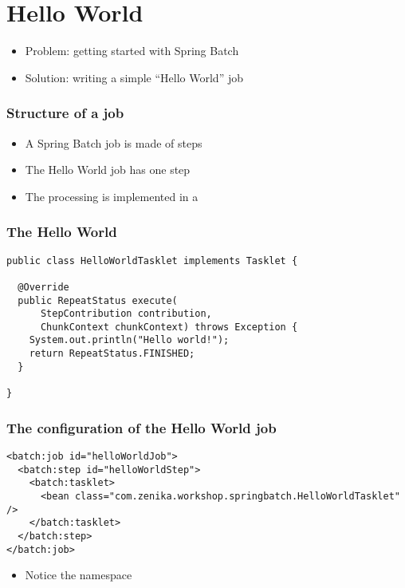 \section{Hello World}

\begin{frame}
 \begin{itemize}
  \item Problem: getting started with Spring Batch
  \item Solution: writing a simple ``Hello World'' job
 \end{itemize}
\end{frame}

\begin{frame}
 \frametitle{Structure of a job}
 \begin{itemize}
  \item A Spring Batch job is made of steps
  \item The Hello World job has one step
  \item The processing is implemented in a 
 \end{itemize}
\end{frame}

\begin{frame}[fragile]
\frametitle{The Hello World }
\lstset{language=Java}
\begin{lstlisting}
public class HelloWorldTasklet implements Tasklet {

  @Override
  public RepeatStatus execute(
      StepContribution contribution,
      ChunkContext chunkContext) throws Exception {
    System.out.println("Hello world!");
    return RepeatStatus.FINISHED;
  }

}
\end{lstlisting}
\end{frame}

\begin{frame}[fragile]
\frametitle{The configuration of the Hello World job}
\lstset{language=XML}
\begin{lstlisting}
<batch:job id="helloWorldJob">
  <batch:step id="helloWorldStep">
    <batch:tasklet>
      <bean class="com.zenika.workshop.springbatch.HelloWorldTasklet" />
    </batch:tasklet>
  </batch:step>
</batch:job>
\end{lstlisting}

\begin{itemize}
 \item Notice the  namespace
\end{itemize}

\end{frame}

